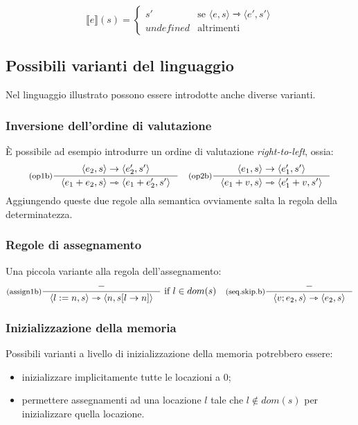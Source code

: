\documentclass[a4paper, 11pt]{article}
\newcommand{\sem}[1]{\llbracket #1 \rrbracket}
\begin{document}
\[ \sem{e}(s) = \begin{cases}
s' &\text{se } \langle e,s \rangle \rightarrowtriangle \langle e',s' \rangle \\
undefined &\text{altrimenti}
\end{cases} \]

\subsection{Possibili varianti del linguaggio}
Nel linguaggio illustrato possono essere introdotte anche diverse varianti.

\subsubsection{Inversione dell'ordine di valutazione}
È possibile ad esempio introdurre un ordine di valutazione \textit{right-to-left}, ossia:
\begin{align*}
	&\inference[(op1b)]{\langle e_2,s \rangle \to \langle e_2', s' \rangle}{\langle e_1 + e_2, s \rangle \rightarrowtriangle \langle e_1 + e_2', s' \rangle}
	&\inference[(op2b)]{\langle e_1,s \rangle \to \langle e_1', s' \rangle}{\langle e_1 + v, s \rangle \rightarrowtriangle \langle e_1' + v, s' \rangle}
\end{align*}
Aggiungendo queste due regole alla semantica ovviamente salta la regola della determinatezza.

\subsubsection{Regole di assegnamento}
Una piccola variante alla regola dell'assegnamento: \begin{align*}
	&\inference[(assign1b)]{-}{\langle l:=n,s \rangle \rightarrowtriangle \langle n, s\lbrack l \to n\rbrack \rangle}\ \text{if } l \in dom(s)
	&\inference[(seq.skip.b)]{-}{\langle v;e_2, s \rangle \rightarrowtriangle \langle e_2, s \rangle}
\end{align*}

\subsubsection{Inizializzazione della memoria}
Possibili varianti a livello di inizializzazione della memoria potrebbero essere: \begin{itemize}
	\item inizializzare implicitamente tutte le locazioni a 0;
	\item permettere assegnamenti ad una locazione $l$ tale che $l \notin dom(s)$ per inizializzare quella locazione.
\end{itemize}
\end{document}
